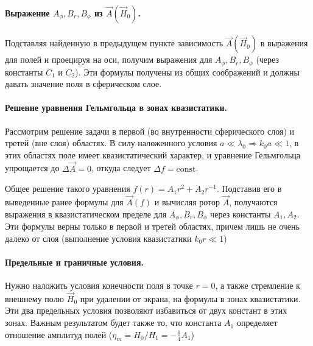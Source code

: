 \documentclass[a4paper,12pt]{article}
\begin{document}
\paragraph{Выражение $A_\phi,B_r,B_\phi$ из $\vec{A}(\vec{H}_0)$.} Подставляя найденную в предыдущем пункте зависимость $\vec{A}(\vec{H}_0)$ в выражения для полей и проецируя на оси, получим выражения для $A_\phi,B_r,B_\phi$ (через константы $C_1$ и $C_2$). Эти формулы получены из общих соображений и должны давать значение поля в сферическом слое.

\paragraph{Решение уравнения Гельмгольца в зонах квазистатики.} Рассмотрим решение задачи в первой (во внутренности сферического слоя) и третей (вне слоя) областях. В силу наложенного условия $a\ll\lambda_0\Rightarrow k_0a\ll 1$, в этих областях поле имеет квазистатический характер, и уравнение Гельмгольца упрощается до $\Delta\vec{A}=0$, откуда следует $\Delta f =\mathrm{const}$. 

Общее решение такого уравнения $f(r)=A_1r^2+A_2r^{-1}$. Подставив его в выведенные ранее формулы для $\vec{A}(f)$ и вычисляя ротор $\vec{A}$, получаются выражения в квазистатическом пределе для $A_\phi,B_r,B_\phi$ через константы $A_1, A_2$. Эти формулы верны только в первой и третей областях, причем лишь не очень далеко от слоя (выполнение условия квазистатики $k_0r\ll 1$)


\paragraph{Предельные и граничные условия.} Нужно наложить условия конечности поля в точке $r=0$, а также стремление к внешнему полю $\vec{H}_0$ при удалении от экрана, на формулы в зонах квазистатики. Эти два предельных условия позволяют избавиться от двух констант в этих зонах. Важным результатом будет также то, что константа $A_1$ определяет отношение амплитуд полей ($\eta_m=H_0/H_1=-\frac14A_1$)
\end{document}
